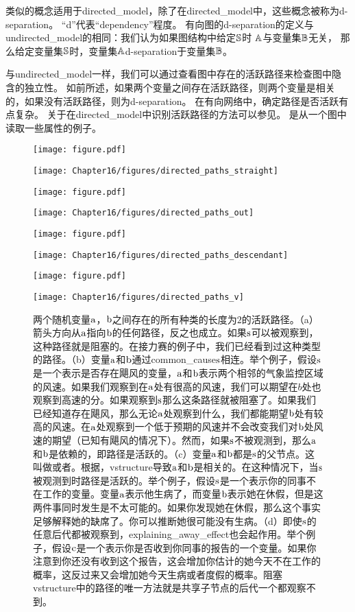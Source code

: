 类似的概念适用于\gls{directed_model}，除了在\gls{directed_model}中，这些概念被称为d-\gls{separation}。
``d''代表``\gls{dependency}''程度。
有向图的d-\gls{separation}的定义与\gls{undirected_model}的相同：我们认为如果图结构中给定$\mathbb{S}$时 $\mathbb{A}$与变量集$\mathbb{B}$无关，
那么给定变量集$\mathbb{S}$时，变量集$\mathbb{A}$d-\gls{separation}于变量集$\mathbb{B}$。


与\gls{undirected_model}一样，我们可以通过查看图中存在的活跃路径来检查图中隐含的独立性。
如前所述，如果两个变量之间存在活跃路径，则两个变量是相关的，如果没有活跃路径，则为d-\gls{separation}。
在有向网络中，确定路径是否活跃有点复杂。
关于在\gls{directed_model}中识别活跃路径的方法可以参见。 
是从一个图中读取一些属性的例子。


\begin{figure}[!htb]
\ifOpenSource
\centerline{\texttt{[image: figure.pdf]}}
\else
	\centerline{\texttt{[image: Chapter16/figures/directed\_paths\_straight]}}	
\fi
\ifOpenSource
\centerline{\texttt{[image: figure.pdf]}}
\else
	\centerline{\texttt{[image: Chapter16/figures/directed\_paths\_out]}}
\fi
\ifOpenSource
\centerline{\texttt{[image: figure.pdf]}}
\else
	\centerline{\texttt{[image: Chapter16/figures/directed\_paths\_descendant]}}
\fi
\ifOpenSource
\centerline{\texttt{[image: figure.pdf]}}
\else
	\centerline{\texttt{[image: Chapter16/figures/directed\_paths\_v]}}		
\fi
	\caption{两个随机变量$\mathrm{a}$，$\mathrm{b}$之间存在的所有种类的长度为$2$的活跃路径。（a）箭头方向从$\mathrm{a}$指向$\mathrm{b}$的任何路径，反之也成立。如果$\mathrm{s}$可以被观察到，这种路径就是阻塞的。在接力赛的例子中，我们已经看到过这种类型的路径。（b）变量$\mathrm{a}$和$\mathrm{b}$通过\gls{common_cause}$\mathrm{s}$相连。举个例子，假设$\mathrm{s}$是一个表示是否存在飓风的变量，$\mathrm{a}$和$\mathrm{b}$表示两个相邻的气象监控区域的风速。如果我们观察到在$\mathrm{a}$处有很高的风速，我们可以期望在$b$处也观察到高速的分。如果观察到$\mathrm{s}$那么这条路径就被阻塞了。如果我们已经知道存在飓风，那么无论$\mathrm{a}$处观察到什么，我们都能期望$\mathrm{b}$处有较高的风速。在$\mathrm{a}$处观察到一个低于预期的风速并不会改变我们对$\mathrm{b}$处风速的期望（已知有飓风的情况下）。然而，如果$\mathrm{s}$不被观测到，那么$\mathrm{a}$和$\mathrm{b}$是依赖的，即路径是活跃的。（c）变量$\mathrm{a}$和$\mathrm{b}$都是$\mathrm{s}$的父节点。这叫做或者。根据，\gls{vstructure}导致$\mathrm{a}$和$\mathrm{b}$是相关的。在这种情况下，当$\mathrm{s}$被观测到时路径是活跃的。举个例子，假设$\mathrm{s}$是一个表示你的同事不在工作的变量。变量$\mathrm{a}$表示他生病了，而变量$\mathrm{b}$表示她在休假，但是这两件事同时发生是不太可能的。如果你发现她在休假，那么这个事实足够解释她的缺席了。你可以推断她很可能没有生病。（d）即使$\mathrm{s}$的任意后代都被观察到，\gls{explaining_away_effect}也会起作用。举个例子，假设$\mathrm{c}$是一个表示你是否收到你同事的报告的一个变量。如果你注意到你还没有收到这个报告，这会增加你估计的她今天不在工作的概率，这反过来又会增加她今天生病或者度假的概率。阻塞\gls{vstructure}中的路径的唯一方法就是共享子节点的后代一个都观察不到。}
	\label{fig:168}
\end{figure}

